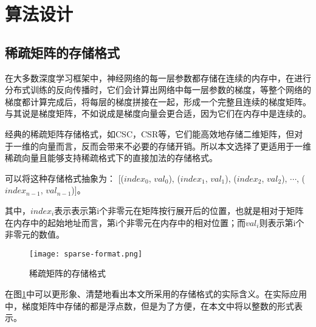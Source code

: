 \section{算法设计}
\subsection{稀疏矩阵的存储格式}
\label{subsec:sparse-format}
在大多数深度学习框架中，神经网络的每一层参数都存储在连续的内存中，在进行分布式训练的反向传播时，它们会计算出网络中每一层参数的梯度，等整个网络的梯度都计算完成后，将每层的梯度拼接在一起，形成一个完整且连续的梯度矩阵。与其说是梯度矩阵，不如说成是梯度向量会更合适，因为它们在内存中是连续的。

经典的稀疏矩阵存储格式，如CSC，CSR等，它们能高效地存储二维矩阵，但对于一维的向量而言，反而会带来不必要的存储开销。所以本文选择了更适用于一维稀疏向量且能够支持稀疏格式下的直接加法的存储格式。

可以将这种存储格式抽象为：
[($index_0$, $val_0$), ($index_1$, $val_1$), ($index_2$, $val_2$), $\cdots$, ($index_{n-1}$, $val_{n-1}$)]。

其中，$index_i$表示表示第i个非零元在矩阵按行展开后的位置，也就是相对于矩阵在内存中的起始地址而言，第i个非零元在内存中的相对位置；而$val_i$则表示第i个非零元的数值。

\begin{figure}[ht] %
  \centering
  \texttt{[image: sparse-format.png]}
  \caption{稀疏矩阵的存储格式}
  \label{fig:sparse-format}
\end{figure}

在图\ref{fig:sparse-format}中可以更形象、清楚地看出本文所采用的存储格式的实际含义。在实际应用中，梯度矩阵中存储的都是浮点数，但是为了方便，在本文中将以整数的形式表示。

